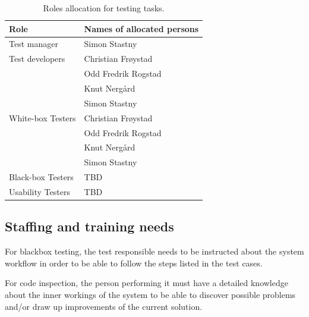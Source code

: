\documentclass[11pt]{book}
\begin{document}
\begin{table}[H]
    \centering
    \begin{tabular}{| l | l |}
        \hline
        Role                & Names of allocated persons    \\ \hline

        Test manager        & Simon Stastny                 \\ \hline

        Test developers     & Christian Frøystad            \\
                            & Odd Fredrik Rogstad           \\
                            & Knut Nergård                  \\
                            & Simon Stastny                 \\ \hline

        White-box Testers   & Christian Frøystad            \\
                            & Odd Fredrik Rogstad           \\
                            & Knut Nergård                  \\
                            & Simon Stastny                 \\ \hline

        Black-box Testers   & TBD                           \\ \hline %

        Usability Testers   & TBD                           \\ \hline %
    \end{tabular}
    \label{tab:test_plan_roles_allocation}
    \caption{Roles allocation for testing tasks.}
\end{table}

\subsection{Staffing and training needs}
For blackbox testing, the test responsible needs to be instructed about the system workflow in order to be able to follow the steps listed in the test cases.

For code inspection, the person performing it must have a detailed knowledge about the inner workings of the system to be able to discover possible problems and/or draw up improvements of the current solution.
\end{document}
